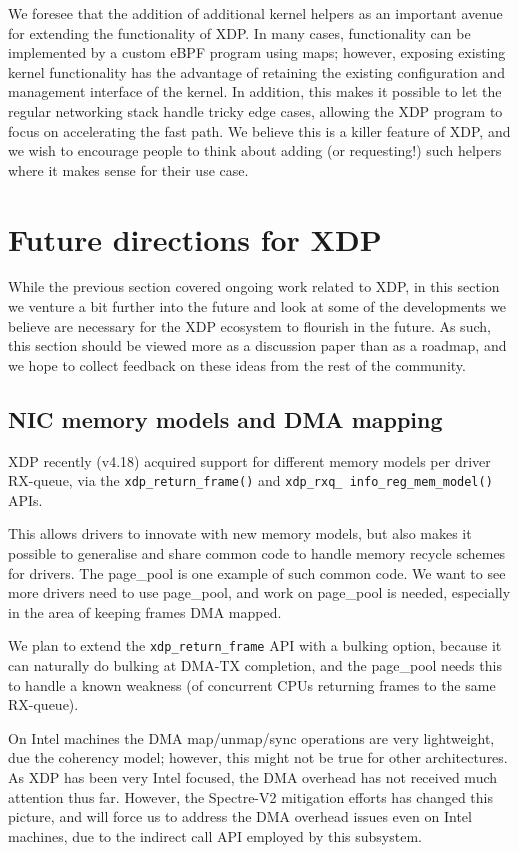 \documentclass[sigconf]{acmart}
\begin{document}
We foresee that the addition of additional kernel helpers as an important avenue
for extending the functionality of XDP. In many cases, functionality can be
implemented by a custom eBPF program using maps; however, exposing existing
kernel functionality has the advantage of retaining the existing configuration
and management interface of the kernel. In addition, this makes it possible to
let the regular networking stack handle tricky edge cases, allowing the XDP
program to focus on accelerating the fast path. We believe this is a killer
feature of XDP, and we wish to encourage people to think about adding (or
requesting!) such helpers where it makes sense for their use case.

\section{Future directions for XDP}
\label{sec:future}
While the previous section covered ongoing work related to XDP, in this section
we venture a bit further into the future and look at some of the developments we
believe are necessary for the XDP ecosystem to flourish in the future. As such,
this section should be viewed more as a discussion paper than as a roadmap, and
we hope to collect feedback on these ideas from the rest of the community.

\subsection{NIC memory models and DMA mapping}
\label{sec:nic-memory-models}

XDP recently (v4.18) acquired support for different memory models per driver
RX-queue, via the \texttt{xdp\_return\_frame()} and
\texttt{xdp\_rxq\_ info\_reg\_mem\_model()} APIs.

This allows drivers to innovate with new memory models, but also makes it
possible to generalise and share common code to handle memory recycle schemes
for drivers. The page\_pool is one example of such common code. We want to see
more drivers need to use page\_pool, and work on page\_pool is needed, especially
in the area of keeping frames DMA mapped.

We plan to extend the \texttt{xdp\_return\_frame} API with a bulking option,
because it can naturally do bulking at DMA-TX completion, and the page\_pool
needs this to handle a known weakness (of concurrent CPUs returning frames to
the same RX-queue).

On Intel machines the DMA map/unmap/sync operations are very lightweight, due
the coherency model; however, this might not be true for other architectures. As
XDP has been very Intel focused, the DMA overhead has not received much
attention thus far. However, the Spectre-V2 mitigation efforts has changed this
picture, and will force us to address the DMA overhead issues even on Intel
machines, due to the indirect call API employed by this subsystem.
\end{document}
